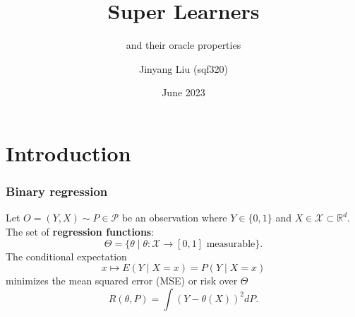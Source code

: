 \documentclass{beamer}
\title{Super Learners}
\subtitle{and their oracle properties}
\author[Jinyang Liu (sqf320)]{Jinyang Liu (sqf320)}
\institute[UCPH] %
{
  Department of Mathematical Sciences\\
  University of Copenhagen
}
\date[VLC 2023]{June 2023}
\newcommand{\btheta}{\theta}
\begin{document}
\frame{\titlepage}
\section{Introduction}
\begin{frame}
    \frametitle{Binary regression}
    Let $ O = (Y, X) \sim P\in\mathcal P $ be an observation where $ Y \in \{0,1\} $ and $ X \in\mathcal X
    \subset\mathbb{R}^{d} $.
    \vfill
    The set of \textbf{regression functions}: $$ \Theta = \{\btheta \mid \btheta : \mathcal{X} \to [0,1] \text{ measurable}\}.$$
    \vfill
    The conditional expectation $$ x \mapsto E(Y \mid X = x) = P(Y \mid X = x) $$ minimizes the  mean squared error (MSE) or risk over \(\Theta\)
        $$
            R(\btheta , P) = \int (Y - \theta(X))^2 d P.
        $$
      \end{frame}
\end{document}
